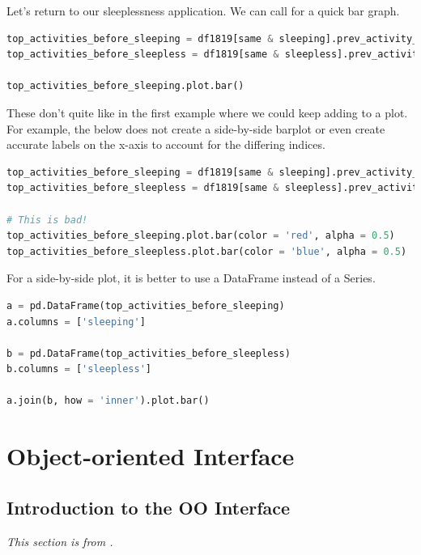 Let's return to our sleeplessness application. We can call  for a quick bar graph. 

\begin{lstlisting}[language = Python]
top_activities_before_sleeping = df1819[same & sleeping].prev_activity_name.value_counts(normalize = True).head()
top_activities_before_sleepless = df1819[same & sleepless].prev_activity_name.value_counts(normalize = True).head()

top_activities_before_sleeping.plot.bar()
\end{lstlisting}

These don't quite like in the first example where we could keep adding to a plot. For example, the below does not create a side-by-side barplot or even create accurate labels on the x-axis to account for the differing indices. 

\begin{lstlisting}[language = Python]
top_activities_before_sleeping = df1819[same & sleeping].prev_activity_name.value_counts(normalize = True).head()
top_activities_before_sleepless = df1819[same & sleepless].prev_activity_name.value_counts(normalize = True).head()

# This is bad!
top_activities_before_sleeping.plot.bar(color = 'red', alpha = 0.5)
top_activities_before_sleepless.plot.bar(color = 'blue', alpha = 0.5)
\end{lstlisting}

For a side-by-side plot, it is better to use a DataFrame instead of a Series. 

\begin{lstlisting}[language = Python]
a = pd.DataFrame(top_activities_before_sleeping)
a.columns = ['sleeping']

b = pd.DataFrame(top_activities_before_sleepless)
b.columns = ['sleepless']

a.join(b, how = 'inner').plot.bar()
\end{lstlisting}







\section{Object-oriented Interface}


\subsection{Introduction to the OO Interface}
\begin{center}
    \textit{This section is from \cite{clark2022story}.}
    
\end{center}


